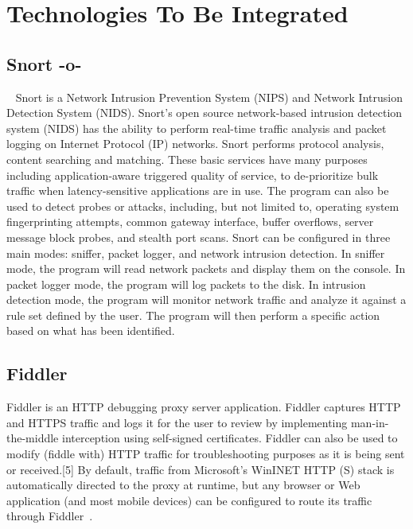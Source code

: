      \pv


\section{Technologies To Be Integrated}
\label{S:o-todo}

\subsection{Snort -o-}
~\cite{www-snort} Snort is a Network Intrusion Prevention System
(NIPS) and Network Intrusion Detection System (NIDS). Snort's open
source network-based intrusion detection system (NIDS) has the ability
to perform real-time traffic analysis and packet logging on Internet
Protocol (IP) networks. Snort performs protocol analysis, content
searching and matching. These basic services have many purposes
including application-aware triggered quality of service, to
de-prioritize bulk traffic when latency-sensitive applications are in
use.  The program can also be used to detect probes or attacks,
including, but not limited to, operating system fingerprinting
attempts, common gateway interface, buffer overflows, server message
block probes, and stealth port scans.  Snort can be configured in
three main modes: sniffer, packet logger, and network intrusion
detection. In sniffer mode, the program will read network packets and
display them on the console. In packet logger mode, the program will
log packets to the disk. In intrusion detection mode, the program will
monitor network traffic and analyze it against a rule set defined by
the user. The program will then perform a specific action based on
what has been identified.

\subsection{Fiddler}

Fiddler is an HTTP debugging proxy server application. Fiddler
captures HTTP and HTTPS traffic and logs it for the user to review by
implementing man-in-the-middle interception using self-signed
certificates. Fiddler can also be used to modify (fiddle with) HTTP
traffic for troubleshooting purposes as it is being sent or
received.[5] By default, traffic from Microsoft's WinINET HTTP (S)
stack is automatically directed to the proxy at runtime, but any
browser or Web application (and most mobile devices) can be configured
to route its traffic through Fiddler~\cite{www-fiddler}.

